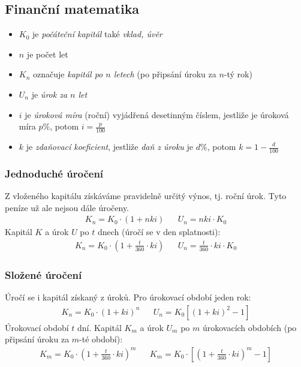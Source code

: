 \documentclass[12pt]{article}
\begin{document}
\subsection{Finanční matematika}
\begin{itemize}
\item $K_0$ je \emph{počáteční kapitál} také \emph{vklad, úvěr}
\item $n$ je počet let
\item $K_n$ označuje \emph{kapitál po $n$ letech} (po připsání úroku za $n$-tý rok)
\item $U_n$ je \emph{úrok za $n$ let}
\item $i$ je \emph{úroková míra} (roční) vyjádřená desetinným číslem, jestliže je úroková míra $p\%$, potom $i = \frac{p}{100}$
\item $k$ je \emph{zdaňovací koeficient}, jestliže \emph{daň z úroku} je $d\%$, potom $k = 1 - \frac{d}{100}$
\end{itemize}
\subsubsection{Jednoduché úročení}
Z vloženého kapitálu získáváme pravidelně určitý výnos, tj. roční úrok. Tyto peníze už ale nejsou dále úročeny.
\begin{align}
K_n = K_0 \cdot (1+ nki) && U_n = nki \cdot K_0
\end{align}
Kapitál $K$ a úrok $U$ po $t$ dnech (úročí se v den splatnosti):
\begin{align}
K_n = K_0 \cdot (1+ \frac{t}{360} \cdot ki) && U_n = \frac{t}{360} \cdot ki \cdot K_0
\end{align}
\subsubsection{Složené úročení}
Úročí se i kapitál získaný z úroků. Pro úrokovací období jeden rok:
\begin{align}
K_n = K_0 \cdot (1+ki)^n && U_n = K_0 \left[ (1+ki)^2 -1  \right]
\end{align}
Úrokovací období $t$ dní. Kapitál $K_m$ a úrok $U_m$ po $m$ úrokovacích obdobích (po připsání úroku za $m$-té období):
\begin{align}
K_m = K_0 \cdot \left( 1 + \frac{t}{360} \cdot ki \right)^m && K_m = K_0 \cdot  \left[ \left( 1 + \frac{t}{360} \cdot ki \right)^m - 1 \right]
\end{align}
\end{document}
